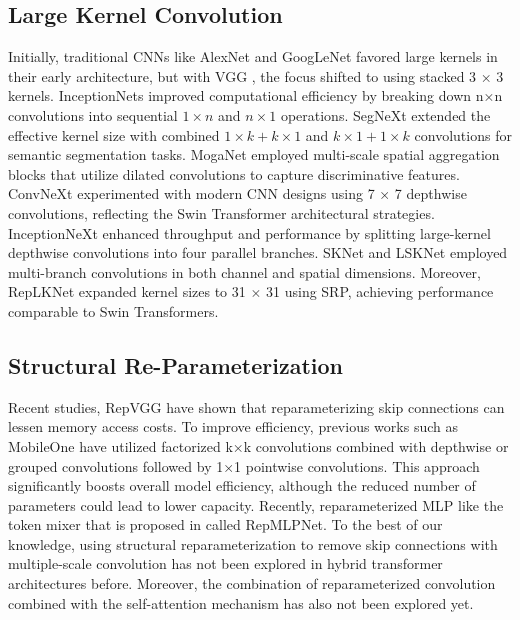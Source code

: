 \subsection{Large Kernel Convolution}
Initially, traditional CNNs like AlexNet and GoogLeNet favored large kernels in their early architecture, but with VGG \cite{ding2021repvgg}, the focus shifted to using stacked 3 × 3 kernels. InceptionNets \cite{szegedy2016rethinking, szegedy2017inception} improved computational efficiency by breaking down n×n convolutions into sequential $1 \times n$ and $n \times 1$ operations. SegNeXt \cite{guo2022segnext} extended the effective kernel size with combined $1 \times k + k \times 1$ and $k \times 1 + 1 \times k$ convolutions for semantic segmentation tasks. MogaNet \cite{li2023moganet} employed multi-scale spatial aggregation blocks that utilize dilated convolutions to capture discriminative features. ConvNeXt \cite{liu2022convnet} experimented with modern CNN designs using 7 × 7 depthwise convolutions, reflecting the Swin Transformer \cite{liu2021swin} architectural strategies. InceptionNeXt \cite{yu2024inceptionnext} enhanced throughput and performance by splitting large-kernel depthwise convolutions into four parallel branches. SKNet \cite{cui2021sknet} and LSKNet \cite{li2024lsknet} employed multi-branch convolutions in both channel and spatial dimensions. Moreover, RepLKNet \cite{ding2022scaling} expanded kernel sizes to 31 $\times$ 31 using SRP, achieving performance comparable to Swin Transformers. 

\subsection{Structural Re-Parameterization}
Recent studies, RepVGG \cite{ding2021repvgg} have shown that reparameterizing skip connections can lessen memory access costs. To improve efficiency, previous works such as MobileOne \cite{vasu2023mobileone} have utilized factorized k×k convolutions combined with depthwise or grouped convolutions followed by 1×1 pointwise convolutions. This approach significantly boosts overall model efficiency, although the reduced number of parameters could lead to lower capacity. Recently, reparameterized MLP like the token mixer that is proposed in \cite{ding2022repmlpnet} called RepMLPNet. To the best of our knowledge, using structural reparameterization to remove skip connections with multiple-scale convolution has not been explored in hybrid transformer architectures before. Moreover, the combination of reparameterized convolution combined with the self-attention mechanism has also not been explored yet.
